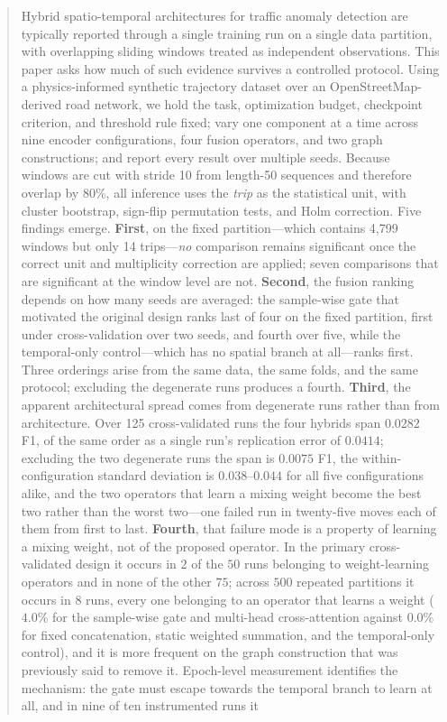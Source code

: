 \documentclass[journal]{IEEEtran}
\begin{document}
\begin{abstract}
Hybrid spatio-temporal architectures for traffic anomaly detection are typically reported through a single training run on a single data partition, with overlapping sliding windows treated as independent observations. This paper asks how much of such evidence survives a controlled protocol. Using a physics-informed synthetic trajectory dataset over an OpenStreetMap-derived road network, we hold the task, optimization budget, checkpoint criterion, and threshold rule fixed; vary one component at a time across nine encoder configurations, four fusion operators, and two graph constructions; and report every result over multiple seeds. Because windows are cut with stride 10 from length-50 sequences and therefore overlap by $80\%$, all inference uses the \emph{trip} as the statistical unit, with cluster bootstrap, sign-flip permutation tests, and Holm correction. Five findings emerge. \textbf{First}, on the fixed partition---which contains 4{,}799 windows but only 14 trips---\emph{no} comparison remains significant once the correct unit and multiplicity correction are applied; seven comparisons that are significant at the window level are not. \textbf{Second}, the fusion ranking depends on how many seeds are averaged: the sample-wise gate that motivated the original design ranks last of four on the fixed partition, first under cross-validation over two seeds, and fourth over five, while the temporal-only control---which has no spatial branch at all---ranks first. Three orderings arise from the same data, the same folds, and the same protocol; excluding the degenerate runs produces a fourth. \textbf{Third}, the apparent architectural spread comes from degenerate runs rather than from architecture. Over 125 cross-validated runs the four hybrids span $0.0282$ F1, of the same order as a single run's replication error of $0.0414$; excluding the two degenerate runs the span is $0.0075$ F1, the within-configuration standard deviation is $0.038$--$0.044$ for all five configurations alike, and the two operators that learn a mixing weight become the best two rather than the worst two---one failed run in twenty-five moves each of them from first to last. \textbf{Fourth}, that failure mode is a property of learning a mixing weight, not of the proposed operator. In the primary cross-validated design it occurs in $2$ of the $50$ runs belonging to weight-learning operators and in none of the other $75$; across $500$ repeated partitions it occurs in $8$ runs, every one belonging to an operator that learns a weight ($4.0\%$ for the sample-wise gate and multi-head cross-attention against $0.0\%$ for fixed concatenation, static weighted summation, and the temporal-only control), and it is more frequent on the graph construction that was previously said to remove it. Epoch-level measurement identifies the mechanism: the gate must escape towards the temporal branch to learn at all, and in nine of ten instrumented runs it 
\end{abstract}
\end{document}
